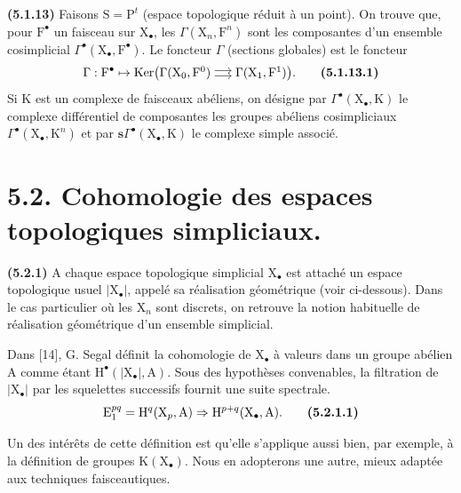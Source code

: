 \documentclass[11pt,leqno]{article}
\begin{document}
\textbf{(5.1.13)} Faisons \(\mathrm{S}=\mathrm{P}^{t}\) (espace topologique réduit à un point). On trouve que, pour \(\mathrm{F}^{\bullet}\) un faisceau sur \(\mathrm{X}_{\bullet}\), les \(\Gamma(\mathrm{X}_n,\mathrm{F}^n)\) sont les composantes d’un ensemble cosimplicial \(\Gamma^{\bullet}(\mathrm{X}_{\bullet},\mathrm{F}^{\bullet})\). Le foncteur \(\Gamma\) (sections globales) est le foncteur
\[
\Gamma:\mathrm{F}^{\bullet}\mapsto
\operatorname{Ker}\bigl(
\begin{tikzcd}[ampersand replacement=\&, cramped, column sep=1.4em, baseline=-0.5ex]
\Gamma(\mathrm{X}_0,\mathrm{F}^0)
  \arrow[r, shift left=0.5ex]
  \arrow[r, shift right=0.5ex]
\& \Gamma(\mathrm{X}_1,\mathrm{F}^1)
\end{tikzcd}
\bigr).
\tag*{\textbf{(5.1.13.1)}}
\]
Si \(\mathrm{K}\) est un complexe de faisceaux abéliens, on désigne par \(\Gamma^{\bullet}(\mathrm{X}_{\bullet},\mathrm{K})\) le complexe différentiel de composantes les groupes abéliens cosimpliciaux \(\Gamma^{\bullet}(\mathrm{X}_{\bullet},\mathrm{K}^n)\) et par \(\boldsymbol{s}\Gamma^{\bullet}(\mathrm{X}_{\bullet},\mathrm{K})\) le complexe simple associé.

\section*{5.2. Cohomologie des espaces topologiques simpliciaux.}

\textbf{(5.2.1)} A chaque espace topologique simplicial \(\mathrm{X}_{\bullet}\) est attaché un espace topologique usuel \(\lvert\mathrm{X}_{\bullet}\rvert\), appelé sa réalisation géométrique (voir ci-dessous). Dans le cas particulier où les \(\mathrm{X}_n\) sont discrets, on retrouve la notion habituelle de réalisation géométrique d’un ensemble simplicial.

Dans [14], G. Segal définit la cohomologie de \(\mathrm{X}_{\bullet}\) à valeurs dans un groupe abélien \(\mathrm{A}\) comme étant \(\mathrm{H}^{\bullet}(\lvert\mathrm{X}_{\bullet}\rvert,\mathrm{A})\). Sous des hypothèses convenables, la filtration de \(\lvert\mathrm{X}_{\bullet}\rvert\) par les squelettes successifs fournit une suite spectrale.
\[
\mathrm{E}_1^{pq}
=\mathrm{H}^q(\mathrm{X}_p,\mathrm{A})
\Rightarrow\mathrm{H}^{p+q}(\mathrm{X}_{\bullet},\mathrm{A}).
\tag*{\textbf{(5.2.1.1)}}
\]

Un des intérêts de cette définition est qu’elle s’applique aussi bien, par exemple, à la définition de groupes \(\mathrm{K}(\mathrm{X}_{\bullet})\). Nous en adopterons une autre, mieux adaptée aux techniques faisceautiques.
\end{document}
